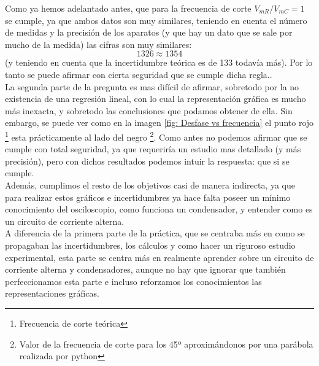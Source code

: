 \documentclass[10pt,a4paper]{article}
\begin{document}
Como ya hemos adelantado antes, que para la frecuencia de corte  $V_{mR}/V_{mC}=1$ se cumple, ya que ambos datos son muy similares, teniendo en cuenta el número de medidas y la precisión de los aparatos (y que hay un dato que se sale por mucho de la medida) las cifras son muy similares:
$$ 1326 \approx 1354 $$ (y teniendo en cuenta que la incertidumbre teórica es de 133 todavía más).
Por lo tanto se puede afirmar con cierta seguridad que se cumple dicha regla.. \\

La segunda parte de la pregunta es mas difícil de afirmar, sobretodo por la no existencia de una regresión lineal, con lo cual la representación gráfica es mucho más inexacta, y sobretodo las conclusiones que podamos obtener de ella. Sin embargo, se puede ver como en la imagen \ref{fig: Desfase vs frecuencia} el punto rojo \footnote{Frecuencia de corte teórica} esta prácticamente  al lado del negro \footnote{Valor de la frecuencia de corte para los 45º aproximándonos por una parábola realizada por python}. Como antes no podemos afirmar que se cumple con total seguridad, ya que requeriría un estudio mas detallado (y más precisión), pero con dichos resultados podemos intuir la respuesta: que si se cumple. \\

Además, cumplimos el resto de los objetivos casi de manera indirecta, ya que para realizar estos gráficos e incertidumbres ya hace falta  poseer un mínimo conocimiento del osciloscopio, como funciona un condensador, y entender como es un circuito de corriente alterna. \\

A diferencia de la primera parte de la práctica, que se centraba más en como se propagaban las incertidumbres, los cálculos y como hacer un riguroso estudio experimental, esta parte se centra más en realmente aprender sobre un circuito de corriente alterna y condensadores, aunque no hay que ignorar que también perfeccionamos esta parte e incluso reforzamos los conocimientos las representaciones gráficas.
\end{document}
